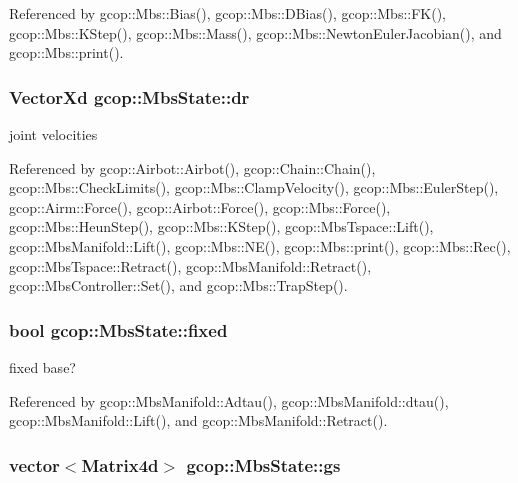 \-Referenced by gcop\-::\-Mbs\-::\-Bias(), gcop\-::\-Mbs\-::\-D\-Bias(), gcop\-::\-Mbs\-::\-F\-K(), gcop\-::\-Mbs\-::\-K\-Step(), gcop\-::\-Mbs\-::\-Mass(), gcop\-::\-Mbs\-::\-Newton\-Euler\-Jacobian(), and gcop\-::\-Mbs\-::print().

\subsubsection[{dr}]{\setlength{\rightskip}{0pt plus 5cm}\-Vector\-Xd {\bf gcop\-::\-Mbs\-State\-::dr}}\label{classgcop_1_1MbsState_a6b5d93e8e49329a2e4bf09fcfa911552}


joint velocities 



\-Referenced by gcop\-::\-Airbot\-::\-Airbot(), gcop\-::\-Chain\-::\-Chain(), gcop\-::\-Mbs\-::\-Check\-Limits(), gcop\-::\-Mbs\-::\-Clamp\-Velocity(), gcop\-::\-Mbs\-::\-Euler\-Step(), gcop\-::\-Airm\-::\-Force(), gcop\-::\-Airbot\-::\-Force(), gcop\-::\-Mbs\-::\-Force(), gcop\-::\-Mbs\-::\-Heun\-Step(), gcop\-::\-Mbs\-::\-K\-Step(), gcop\-::\-Mbs\-Tspace\-::\-Lift(), gcop\-::\-Mbs\-Manifold\-::\-Lift(), gcop\-::\-Mbs\-::\-N\-E(), gcop\-::\-Mbs\-::print(), gcop\-::\-Mbs\-::\-Rec(), gcop\-::\-Mbs\-Tspace\-::\-Retract(), gcop\-::\-Mbs\-Manifold\-::\-Retract(), gcop\-::\-Mbs\-Controller\-::\-Set(), and gcop\-::\-Mbs\-::\-Trap\-Step().

\subsubsection[{fixed}]{\setlength{\rightskip}{0pt plus 5cm}bool {\bf gcop\-::\-Mbs\-State\-::fixed}}\label{classgcop_1_1MbsState_a4948534a96d71d828500b81fc16b7763}


fixed base? 



\-Referenced by gcop\-::\-Mbs\-Manifold\-::\-Adtau(), gcop\-::\-Mbs\-Manifold\-::dtau(), gcop\-::\-Mbs\-Manifold\-::\-Lift(), and gcop\-::\-Mbs\-Manifold\-::\-Retract().

\subsubsection[{gs}]{\setlength{\rightskip}{0pt plus 5cm}vector$<${\bf \-Matrix4d}$>$ {\bf gcop\-::\-Mbs\-State\-::gs}}\label{classgcop_1_1MbsState_ae1fc5bb244bba26d065d9f095391158c}


